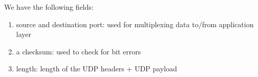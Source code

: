 We have the following fields:
\begin{enumerate}
	\item source and destination port: used for multiplexing data to/from application layer
	\item a checksum: used to check for bit errors
	\item length: length of the UDP headers + UDP payload
\end{enumerate}
